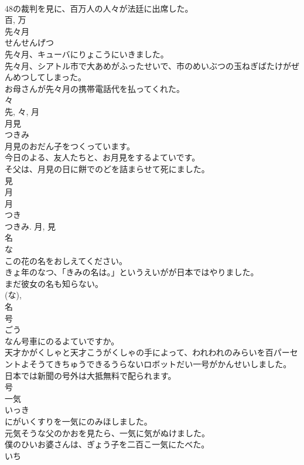 \documentclass[8pt]{extreport}
\begin{document}
\begin{CJK}{UTF8}{min}
\\	48の裁判を見に、百万人の人々が法廷に出席した。	
\\	百, 万	
\\	先々月	
\\	せんせんげつ	
\\	先々月、キューバにりょこうにいきました。	
\\	先々月、シアトル市で大あめがふったせいで、市のめいぶつの玉ねぎばたけがぜんめつしてしまった。	
\\	お母さんが先々月の携帯電話代を払ってくれた。	
\\	々 
\\	先, 々, 月	
\\	月見	
\\	つきみ	
\\	月見のおだん子をつくっています。	
\\	今日のよる、友人たちと、お月見をするよていです。	
\\	そ父は、月見の日に餅でのどを詰まらせて死にました。	
\\	見 
\\	月 
\\	月 
\\	つき 
\\	つきみ.	月, 見	
\\	名	
\\	な	
\\	この花の名をおしえてください。	
\\	きょ年のなつ、「きみの名は。」というえいがが日本ではやりました。	
\\	まだ彼女の名も知らない。	
\\	(な), 
\\	名	
\\	号	
\\	ごう	
\\	なん号車にのるよていですか。	
\\	天才かがくしゃと天才こうがくしゃの手によって、われわれのみらいを百パーセントよそうてきちゅうできるうらないロボットだい一号がかんせいしました。	
\\	日本では新聞の号外は大抵無料で配られます。	
\\	号	
\\	一気	
\\	いっき	
\\	にがいくすりを一気にのみほしました。	
\\	元気そうな父のかおを見たら、一気に気がぬけました。	
\\	僕のひいお婆さんは、ぎょう子を二百こ一気にたべた。	
\\	いち 

\end{CJK}
\end{document}

